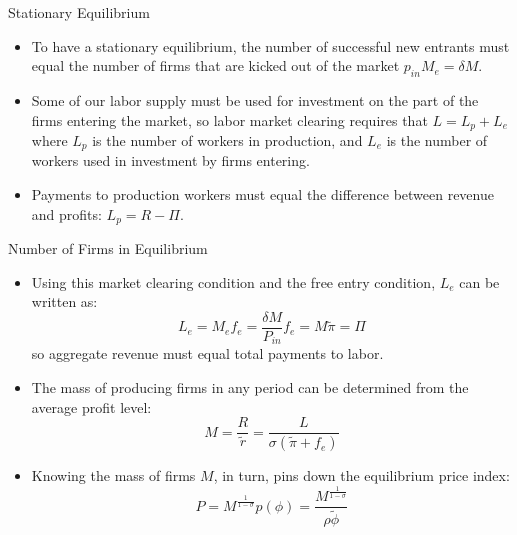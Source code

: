 \documentclass[aspectratio=169]{beamer}
\begin{document}

\begin{frame}{Stationary Equilibrium}

\begin{itemize}
    \item<1-> To have a stationary equilibrium, the number of successful new entrants must equal the number of firms that are kicked out of the market $ p_{in} M_{e} = \delta M $.
    \item<2->  Some of our labor supply must be used for investment on the part of the firms entering the market, so labor market clearing requires that $ L = L_{p} + L_{e} $ where $ L_{p} $ is the number of workers in production, and $ L_{e} $ is the number of workers used in investment by firms entering.
    \item<3->  Payments to production workers must equal the difference between revenue and profits: $ L_{p} = R - \Pi $.
\end{itemize}
    
\end{frame}


\begin{frame}{Number of Firms in Equilibrium}

\begin{itemize}
    \item<1-> Using this market clearing condition and the free entry condition, $ L_{e} $ can be written as:
    \begin{equation*}
        L_{e} = M_{e} f_{e} = \frac{\delta M}{P_{in}} f_{e} = M \tilde{\pi} = \Pi
    \end{equation*}
    so aggregate revenue must equal total payments to labor.
    \item<2-> The mass of producing firms in any period can be determined from the average profit level:
    \begin{equation*}
        M = \frac{R}{\tilde{r}} = \frac{L}{\sigma\left( \tilde{\pi} + f_{e} \right)}
    \end{equation*}
    \item<3-> Knowing the mass of firms $ M $, in turn, pins down the equilibrium price index:
    \begin{equation*}
        P = M^{\frac{1}{1 - \sigma}} p\left( \phi \right) = \frac{M^{\frac{1}{1 - \sigma}}}{\rho \tilde{\phi}}
    \end{equation*}
\end{itemize}
    
\end{frame}
\end{document}
